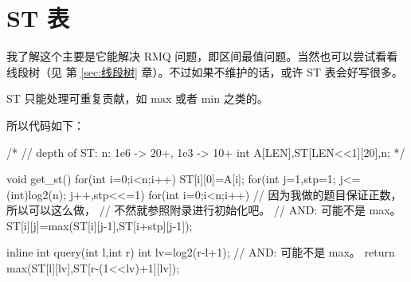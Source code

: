 \section{ST 表} \label{sec:ST表}
我了解这个主要是它能解决 RMQ 问题，即区间最值问题。当然也可以尝试看看线段树（见
第 \ref{sec:线段树} 章）。不过如果不维护的话，或许 ST 表会好写很多。

ST 只能处理可重复贡献，如 $\mathrm{max}$ 或者 $\mathrm{min}$ 之类的。

所以代码如下：
\begin{Cpp}
/*
  // depth of ST: n: 1e6 -> 20+, 1e3 -> 10+
  int A[LEN],ST[LEN<<1][20],n;
*/

void get_st(){
  for(int i=0;i<n;i++){
    ST[i][0]=A[i];
  }
  for(int j=1,stp=1; j<=(int)log2(n);
      j++,stp<<=1){
    for(int i=0;i<n;i++){
      // 因为我做的题目保证正数，所以可以这么做，
      // 不然就参照附录进行初始化吧。
      // AND: 可能不是 max。
      ST[i][j]=max(ST[i][j-1],ST[i+stp][j-1]);
    }
  }
}

inline int query(int l,int r){
  int lv=log2(r-l+1);
  // AND: 可能不是 max。
  return max(ST[l][lv],ST[r-(1<<lv)+1][lv]);
}
\end{Cpp}
